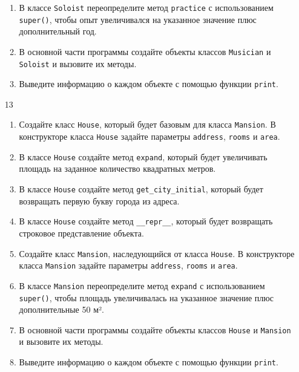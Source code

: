 \begin{enumerate}
\begin{enumerate}[leftmargin=*]
    \item В классе \texttt{Soloist} переопределите метод \texttt{practice} с использованием \texttt{super()}, чтобы опыт увеличивался на указанное значение плюс дополнительный год.
    
    \item В основной части программы создайте объекты классов \texttt{Musician} и \texttt{Soloist} и вызовите их методы.
    
    \item Выведите информацию о каждом объекте с помощью функции \texttt{print}.
\end{enumerate}

\item[13] 
\begin{enumerate}[leftmargin=*]
    \item Создайте класс \texttt{House}, который будет базовым для класса \texttt{Mansion}. В конструкторе класса \texttt{House} задайте параметры \texttt{address}, \texttt{rooms} и \texttt{area}.
    
    \item В классе \texttt{House} создайте метод \texttt{expand}, который будет увеличивать площадь на заданное количество квадратных метров.
    
    \item В классе \texttt{House} создайте метод \texttt{get\_city\_initial}, который будет возвращать первую букву города из адреса.
    
    \item В классе \texttt{House} создайте метод \texttt{\_\_repr\_\_}, который будет возвращать строковое представление объекта.
    
    \item Создайте класс \texttt{Mansion}, наследующийся от класса \texttt{House}. В конструкторе класса \texttt{Mansion} задайте параметры \texttt{address}, \texttt{rooms} и \texttt{area}.
    
    \item В классе \texttt{Mansion} переопределите метод \texttt{expand} с использованием \texttt{super()}, чтобы площадь увеличивалась на указанное значение плюс дополнительные 50 м².
    
    \item В основной части программы создайте объекты классов \texttt{House} и \texttt{Mansion} и вызовите их методы.
    
    \item Выведите информацию о каждом объекте с помощью функции \texttt{print}.
\end{enumerate}


\end{enumerate}

